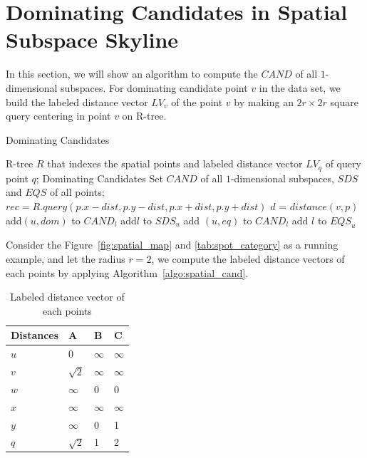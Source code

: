 \section{Dominating Candidates in Spatial Subspace Skyline}

In this section, we will show an algorithm to compute the $\mathit{CAND}$ of all $1$-dimensional subspaces. For dominating candidate point $v$ in the data set, we build the labeled distance vector $LV_v$ of the point $v$ by making an $2r \times 2r$ square query centering in point $v$ on R-tree.

\begin{algorithm}[H]
  \caption{Dominating Candidates}
  \label{algo:spatial_cand}
  \begin{algorithmic}[1]
  \show\LOOP
    \REQUIRE R-tree $R$ that indexes the spatial points and labeled distance vector $LV_q$ of query point $q$;
    \ENSURE Dominating Candidates Set $\mathit{CAND}$ of all $1$-dimensional subspaces, $\mathit{SDS}$ and $\mathit{EQS}$ of all points;
            \STATE $rec = R.query(p.x-dist, p.y-dist, p.x+dist, p.y+dist)$
                \STATE $d$ = $distance(v, p)$
                    \STATE add$(u, dom)$ to $\mathit{CAND}_l$
                    \STATE add$l$ to $\mathit{SDS}_u$
                \ENDIF
                    \STATE add $(u, eq)$ to $\mathit{CAND}_l$
                    \STATE add $l$ to $\mathit{EQS}_u$
                \ENDIF
            \ENDFOR
            
        \ENDFOR
    \ENDFOR
  \end{algorithmic}
\end{algorithm}

Consider the Figure~\ref{fig:spatial_map} and \ref{tab:spot_category} as a running example, and let the radius $r = 2$, we compute the labeled distance vectors of each points by applying Algorithm~\ref{algo:spatial_cand}.

\begin{table}[h]
    \centering
    \begin{tabular}{llll}
    \hline
    Distances & A & B & C \\ \hline
    $u$       & 0 & $\infty$ & $\infty$ \\ \hline
    $v$       & $\sqrt{2}$ & $\infty$ & $\infty$ \\ \hline
    $w$       & $\infty$ & 0 & 0 \\ \hline
    $x$       & $\infty$ & $\infty$ & $\infty$ \\ \hline
    $y$       & $\infty$ & 0 & 1 \\ \hline
    $q$       & $\sqrt{2}$ & 1 & 2 \\ \hline
    \end{tabular}
    \caption{Labeled distance vector of each points}
    \label{tab:lv_spatial}
\end{table}

